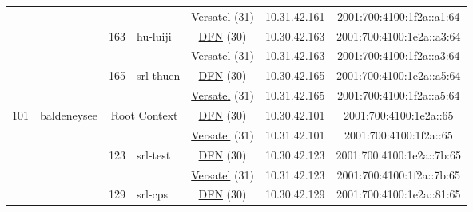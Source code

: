 \begin{small}
\begin{center}
\begin{longtable}{|c|c|c|c|c|c|c|c|}
  &  &  &  & \multicolumn{2}{|c|}{\tiny{\href{http://www.versatel.de}{Versatel} (31)}} & \tiny{10.31.42.161} & \tiny{2001:700:4100:1f2a::a1:64} \\* \cline{3-3}\cline{4-4}\cline{5-5}\cline{6-6}\cline{7-7}\cline{8-8}
  &  & \multirow{2}{*}{\tiny{163}} & \multicolumn{1}{|l|}{\multirow{2}{*}{\tiny{hu-luiji}}} & \multicolumn{2}{|c|}{\tiny{\href{https://www.dfn.de}{DFN} (30)}} & \tiny{10.30.42.163} & \tiny{2001:700:4100:1e2a::a3:64} \\* \cline{5-5}\cline{6-6}\cline{7-7}\cline{8-8}
  &  &  &  & \multicolumn{2}{|c|}{\tiny{\href{http://www.versatel.de}{Versatel} (31)}} & \tiny{10.31.42.163} & \tiny{2001:700:4100:1f2a::a3:64} \\* \cline{3-3}\cline{4-4}\cline{5-5}\cline{6-6}\cline{7-7}\cline{8-8}
  &  & \multirow{2}{*}{\tiny{165}} & \multicolumn{1}{|l|}{\multirow{2}{*}{\tiny{srl-thuen}}} & \multicolumn{2}{|c|}{\tiny{\href{https://www.dfn.de}{DFN} (30)}} & \tiny{10.30.42.165} & \tiny{2001:700:4100:1e2a::a5:64} \\* \cline{5-5}\cline{6-6}\cline{7-7}\cline{8-8}
  &  &  &  & \multicolumn{2}{|c|}{\tiny{\href{http://www.versatel.de}{Versatel} (31)}} & \tiny{10.31.42.165} & \tiny{2001:700:4100:1f2a::a5:64} \\ \hline
 \multirow{28}{*}{\tiny{101}} & \multicolumn{1}{|l|}{\multirow{28}{*}{\tiny{baldeneysee}}} & \multicolumn{2}{|c|}{\multirow{2}{*}{\tiny{Root Context}}} & \multicolumn{2}{|c|}{\tiny{\href{https://www.dfn.de}{DFN} (30)}} & \tiny{10.30.42.101} & \tiny{2001:700:4100:1e2a::65} \\* \cline{5-5}\cline{6-6}\cline{7-7}\cline{8-8}
  &  & \multicolumn{2}{|c|}{} & \multicolumn{2}{|c|}{\tiny{\href{http://www.versatel.de}{Versatel} (31)}} & \tiny{10.31.42.101} & \tiny{2001:700:4100:1f2a::65} \\* \cline{3-3}\cline{4-4}\cline{5-5}\cline{6-6}\cline{7-7}\cline{8-8}
  &  & \multirow{2}{*}{\tiny{123}} & \multicolumn{1}{|l|}{\multirow{2}{*}{\tiny{srl-test}}} & \multicolumn{2}{|c|}{\tiny{\href{https://www.dfn.de}{DFN} (30)}} & \tiny{10.30.42.123} & \tiny{2001:700:4100:1e2a::7b:65} \\* \cline{5-5}\cline{6-6}\cline{7-7}\cline{8-8}
  &  &  &  & \multicolumn{2}{|c|}{\tiny{\href{http://www.versatel.de}{Versatel} (31)}} & \tiny{10.31.42.123} & \tiny{2001:700:4100:1f2a::7b:65} \\* \cline{3-3}\cline{4-4}\cline{5-5}\cline{6-6}\cline{7-7}\cline{8-8}
  &  & \multirow{2}{*}{\tiny{129}} & \multicolumn{1}{|l|}{\multirow{2}{*}{\tiny{srl-cps}}} & \multicolumn{2}{|c|}{\tiny{\href{https://www.dfn.de}{DFN} (30)}} & \tiny{10.30.42.129} & \tiny{2001:700:4100:1e2a::81:65} \\* \cline{5-5}\cline{6-6}\cline{7-7}\cline{8-8}

\end{longtable}
\end{center}
\end{small}
